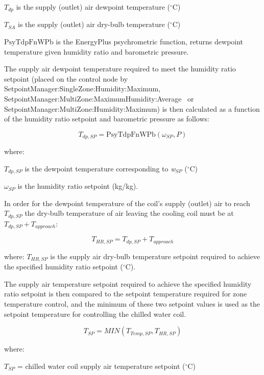 \({T_{dp}}\) is the supply (outlet) air dewpoint temperature (\(^{\circ}\)C)

\({T_{SA}}\) is the supply (outlet) air dry-bulb temperature (\(^{\circ}\)C)

\({\mathrm{PsyTdpFnWPb}}\) is the EnergyPlus psychrometric function, returns dewpoint temperature given humidity ratio and barometric pressure.

The supply air dewpoint temperature required to meet the humidity ratio setpoint (placed on the control node by SetpointManager:SingleZone:Humidity:Maximum, SetpointManager:MultiZone:MaximumHumidity:Average~ or SetpointManager:MultiZone:Humidity:Maximum) is then calculated as a function of the humidity ratio setpoint and barometric pressure as follows:

\begin{equation}
{T_{dp,SP}} = {\mathrm{PsyTdpFnWPb}}\left( {{\omega_{SP}},P} \right)
\end{equation}

where:

\({T_{dp,SP}}\) is the dewpoint temperature corresponding to \emph{w\(_{SP}\)} (\(^{\circ}\)C)

\({\omega_{SP}}\) is the humidity ratio setpoint (kg/kg).

In order for the dewpoint temperature of the coil's supply (outlet) air to reach \({T_{dp,SP}}\) the dry-bulb temperature of air leaving the cooling coil must be at \({T_{dp,SP}} + {T_{approach}}\):

\begin{equation}
{T_{HR,SP}} = {T_{dp,SP}} + {T_{approach}}
\end{equation}

where: \({T_{HR,SP}}\) is the supply air dry-bulb temperature setpoint required to achieve the specified humidity ratio setpoint (\(^{\circ}\)C).

The supply air temperature setpoint required to achieve the specified humidity ratio setpoint is then compared to the setpoint temperature required for zone temperature control, and the minimum of these two setpoint values is used as the setpoint temperature for controlling the chilled water coil.

\begin{equation}
{T_{SP}} = MIN\left( {{T_{Temp,SP}},{T_{HR,SP}}} \right)
\end{equation}

where:

\({T_{SP}}\) = chilled water coil supply air temperature setpoint (\(^{\circ}\)C)

